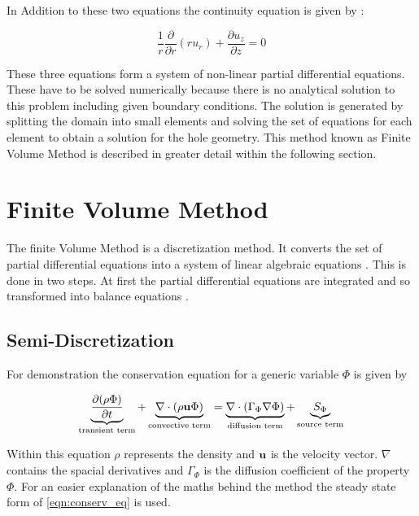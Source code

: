\documentclass[../thesis.tex]{subfiles}
\begin{document}
In Addition to these two equations the continuity equation is given by \cite{vitturi2016navier}:

\begin{equation}
	\dfrac{1}{r} \dfrac{\partial}{\partial r}(r u_r) + \dfrac{\partial u_z}{\partial z} = 0
\end{equation}

These three equations form a system of non-linear partial differential equations. These have to be solved numerically because there is no analytical solution to this problem including given boundary conditions. The solution is generated by splitting the domain into small elements and solving the set of equations for each element to obtain a solution for the hole geometry. This method known as Finite Volume Method is described in greater detail within the following section.

\section{Finite Volume Method}

The finite Volume Method is a discretization method. It converts the set of partial differential equations into a system of linear algebraic equations \cite{darwish2021finite}. This is done in two steps. At first the partial differential equations are integrated and so transformed into balance equations \cite{darwish2021finite}. 

\subsection{Semi-Discretization}

For demonstration the conservation equation for a generic variable $ \Phi $ is given by

\begin{equation}
	\label{eqn:conserv_eq}
	\underbrace{\dfrac{\partial(\rho \Phi)}{\partial t}}_{\text{transient term}} + \underbrace{\nabla \cdot (\rho \bold{u} \Phi)}_{\text{convective term}} = \underbrace{\nabla \cdot (\Gamma_\Phi \nabla \Phi)}_{\text{diffusion term}} + \underbrace{S_\Phi}_{\text{source term}}
\end{equation}

Within this equation $ \rho $ represents the density and $ \bold{u} $ is the velocity vector. $ \nabla $ contains the spacial derivatives and $ \Gamma_\Phi $ is the diffusion coefficient of the property $ \Phi $.
For an easier explanation of the maths behind the method the steady state form of \autoref{eqn:conserv_eq} is used.
\end{document}
